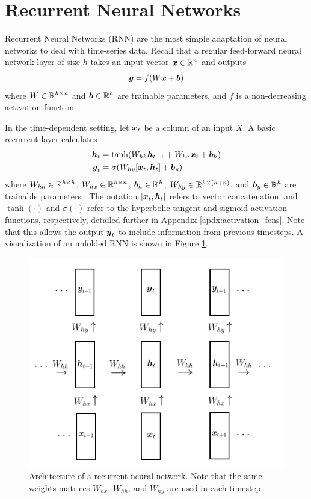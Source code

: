 \section{Recurrent Neural Networks}
Recurrent Neural Networks (RNN) are the most simple adaptation of neural networks to deal with time-series data. Recall that a regular feed-forward neural network layer of size $h$ takes an input vector $\boldsymbol{x} \in \mathbb{R}^n$ and outputs
\begin{equation}
  \boldsymbol{y} = f( W\boldsymbol{x} + \boldsymbol{b})
  \label{eq:ffn_layer}
\end{equation}
where $W \in \mathbb{R}^{h \times n}$ and $\boldsymbol{b} \in \mathbb{R}^h$ are trainable parameters, and $f$ is a non-decreasing activation function \cite{sharma2020}. 

In the time-dependent setting, let $\boldsymbol{x}_t$ be a column of an input $X$. A basic recurrent layer calculates 
\begin{equation}
  \begin{split}
    \boldsymbol{h}_t &= \tanh(W_{hh}\boldsymbol{h}_{t-1} + W_{hx}\boldsymbol{x}_t + \boldsymbol{b}_h) \\
    \boldsymbol{y}_t &= \sigma(W_{hy}[\boldsymbol{x}_t, \boldsymbol{h}_t] + \boldsymbol{b}_y)
\end{split}
  \label{eq:rnn_layer}
\end{equation}
where $W_{hh} \in \mathbb{R}^{h\times h}$, $W_{hx}\in \mathbb{R}^{h\times n}$, $\boldsymbol{b}_h \in \mathbb{R}^h$, $W_{hy} \in \mathbb{R}^{h \times (h+n)}$, and $\boldsymbol{b}_y \in \mathbb{R}^h$ are trainable parameters \cite{elman1990}. The notation $[\boldsymbol{x}_t, \boldsymbol{h}_t]$ refers to vector concatenation, and $\tanh(\cdot)$ and $\sigma(\cdot)$ refer to the hyperbolic tangent and sigmoid activation functions, respectively, detailed further in Appendix \ref{apdx:activation_fcns}. Note that this allows the output $\boldsymbol{y}_t$ to include information from previous timesteps. A visualization of an unfolded RNN is shown in Figure \ref{fig:rnn_visual}.

\begin{figure}[h]
  \centering
  \includegraphics[width=.5\textwidth]{img/rnn_visual.png}
  \caption{Architecture of a recurrent neural network. Note that the same weights matrices $W_{hx}$, $W_{hh}$, and $W_{hy}$ are used in each timestep.}
  \label{fig:rnn_visual}
\end{figure}

